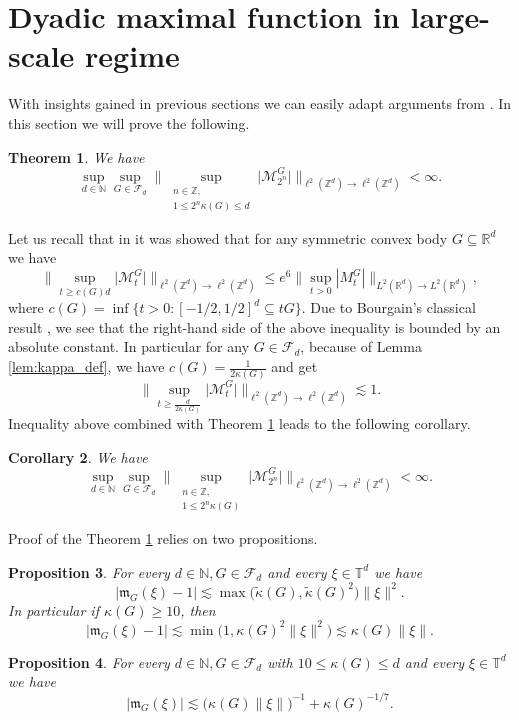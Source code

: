 \documentclass[a4paper,oneside, reqno]{amsart}
\numberwithin{equation}{section}
\newtheorem{Thm}{Theorem}[section]
\newtheorem{Cor}[Thm]{Corollary}
\newtheorem{Prop}[Thm]{Proposition}
\theoremstyle{definition}%
\theoremstyle{definition}
\theoremstyle{definition}%
\theoremstyle{definition}
\newcommand{\Z}{\mathbb{Z}}
\newcommand{\R}{\mathbb{R}}
\newcommand{\N}{\mathbb{N}}
\newcommand{\T}{\mathbb{T}}
\begin{document}
\section{Dyadic maximal function in large-scale regime}
With insights gained in previous sections we can easily adapt arguments from \cite[Section 8.2]{balls}.
In this section we will prove the following.
\begin{Thm} \label{large scale}
    We have
    \[
    \sup_{d \in \N} \sup_{G \in \mathcal{F}_d} \Big\| \sup_{\substack{n \in \Z, \\ 1 \le 2^n \kappa(G) \le d}} \big|\mathcal{M}_{2^n}^G\big| \Big\|_{\ell^2(\Z^d) \to \ell^2(\Z^d)}< \infty.
    \]
\end{Thm}
Let us recall that in \cite[Theorem 1]{cubes} it was showed that for any symmetric convex body $G \subseteq \R^d$ we have
\[
    \Big\| \sup_{t \ge c(G) d} \big| \mathcal{M}_t^G  \big| \Big\|_{\ell^2(\Z^d) \to \ell^2(\Z^d)} \le e^6 \Big\| \sup_{t>0} |M_t^G| \Big\|_{L^2(\R^d) \to L^2(\R^d) },
    \]
    where $c(G)= \inf\{t>0: [-1/2,1/2]^d \subseteq tG \}$. Due to Bourgain's classical result \cite{B1}, we see that the right-hand side of the above inequality is bounded by an absolute constant. In particular for any $G \in \mathcal{F}_d$, because of Lemma \ref{lem:kappa_def}, we have $c(G)= \frac{1}{2 \kappa(G)}$ and get 
\[
\Big\| \sup_{t \ge  \frac{d}{2 \kappa(G)}} \big| \mathcal{M}_t^G  \big| \Big\|_{\ell^2(\Z^d) \to \ell^2(\Z^d)} \lesssim 1. 
\]
Inequality above combined with Theorem \ref{large scale} leads to the following corollary.
\begin{Cor} \label{large scale no upper restr}
    We have
    \[
    \sup_{d \in \N} \sup_{G \in \mathcal{F}_d} \Big\| \sup_{\substack{n \in \Z, \\ 1 \le 2^n \kappa(G) }} \big|\mathcal{M}_{2^n}^G \big| \Big\|_{\ell^2(\Z^d) \to \ell^2(\Z^d)}< \infty.
    \]
\end{Cor}
Proof of the Theorem \ref{large scale} relies on two propositions.
\begin{Prop} \label{large scale m-1 bound}
    For every $d \in \N, G \in \mathcal{F}_d$ and every $\xi \in \T^d$ we have
    \[
    |\mathfrak{m}_G(\xi)-1| \lesssim \max\Big(\widetilde{\kappa}(G),\widetilde{\kappa}(G)^2 \Big)  \| \xi\|^2.
    \]
    In particular if $\kappa(G) \ge 10$, then
    \[
    |\mathfrak{m}_G(\xi)-1| \lesssim \min\big(1, \kappa(G)^2 \| \xi\|^2\big) \lesssim \kappa(G) \| \xi \|.
    \]
\end{Prop}
\begin{Prop} \label{large scale m bound}
    For every $d \in \N, G \in \mathcal{F}_d$ with $10 \le \kappa(G) \le d$ and every $\xi \in \T^d$ we have
    \begin{equation} \label{eq:large m bound}
    |\mathfrak{m}_G(\xi)| \lesssim \Big( \kappa(G) \| \xi\| \Big)^{-1} + \kappa(G)^{-1/7}.
    \end{equation}
\end{Prop}
\end{document}
